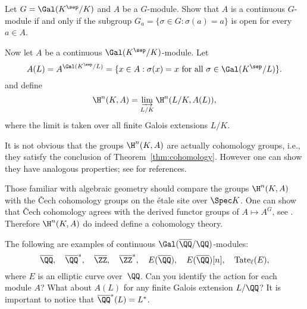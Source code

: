 \begin{exercise}
  Let $G = \Gal(K^{\sep}/K)$ and $A$ be a $G$-module.
  Show that $A$ is a continuous $G$-module
  if and only if the subgroup
  $G_a = \{\sigma \in G : \sigma(a) = a\}$ is open
  for every $a\in A$.
\end{exercise}

Now let $A$ be a continuous $\Gal(K^{\sep}/K)$-module. Let
\[
  A(L) = A^{\Gal(K^{\sep}/L)} = \{x \in A : \sigma(x) = x
  \text{ for all } \sigma \in\Gal(K^{\sep}/L)\}.
\]
and define
\[
  \H^n(K,A) = \varinjlim_{L/K} \H^n(L/K,A(L)),
\]
where the limit is taken over all finite Galois
extensions $L/K$.

It is not obvious that the groups $\H^n(K,A)$ are
actually cohomology groups, i.e., they satisfy the
conclusion of Theorem~\ref{thm:cohomology}. However
one can show they have analogous properties; see
\cite[Ch.~X.3]{serre:localfields} for references.

\begin{remark}
  Those familiar with algebraic geometry should
  compare the groups $\H^n(K,A)$ with the \v{C}ech
  cohomology groups on the \'{e}tale site over $\Spec K$.
  One can show that \v{C}ech cohomology
  agrees with the derived functor groups of
  $A\mapsto A^G$, see \cite[Ch.~10]{milne:etale}.
  Therefore $\H^n(K,A)$ do indeed define a cohomology
  theory.
\end{remark}

\begin{example}
  The following are examples of continuous $\Gal(\overline{\QQ}/\QQ)$-modules:
  \[
    \overline{\QQ},
    \quad \overline{\QQ}^*,
    \quad \overline{\ZZ},
    \quad \overline{\ZZ}^*,
    \quad E(\overline{\QQ}),
    \quad E(\overline{\QQ})[n],
    \quad {\rm Tate}_{\ell}(E),
  \]
  where $E$ is an elliptic curve over~$\QQ$. Can you identify the
  action for each module $A$? What about $A(L)$ for any finite
  Galois extension $L/\QQ$? It is important to notice that
  $\overline{\QQ}^*(L) = L^*$.
\end{example}


